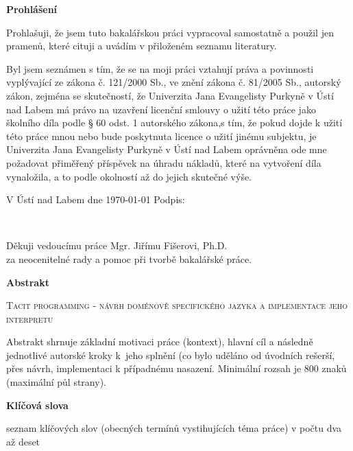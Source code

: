 \documentclass[male,czech]{kithesis}
\newcommand{\TITULcz}{Tacit programming - návrh doménově specifického jazyka a implementace jeho interpretu} %
\begin{document}
\cleardoublepage
\thispagestyle{empty}

\textbf{Prohlášení}

Prohlašuji, že jsem tuto bakalářskou práci vypracoval samostatně a použil
jen pramenů, které cituji a uvádím v přiloženém seznamu literatury.

\vspace{1em}
Byl jsem seznámen s tím, že se na moji práci vztahují práva a povinnosti vyplývající ze zákona č. 121/2000 Sb., ve znění zákona č. 81/2005 Sb., autorský zákon, zejména se skutečností, že Univerzita Jana Evangelisty Purkyně v Ústí nad Labem má právo na uzavření licenční smlouvy o užití této práce jako školního díla podle § 60 odst. 1 autorského zákona,s tím, že pokud dojde k užití této práce mnou nebo bude poskytnuta licence o užití jinému
subjektu, je Univerzita Jana Evangelisty Purkyně v Ústí nad Labem oprávněna ode mne požadovat přiměřený příspěvek na úhradu nákladů, které na vytvoření díla vynaložila, a to podle okolností až do jejich skutečné výše.

\vspace{1em}
V Ústí nad Labem dne \today \hspace{0.3\textwidth} Podpis:


\cleardoublepage
\thispagestyle{empty}
~\vfill

\begin{flushright}
  Děkuji vedoucímu práce Mgr. Jiřímu Fišerovi, Ph.D.\\ za neocenitelné rady a pomoc při tvorbě bakalářské práce.
\end{flushright}

\cleardoublepage
\thispagestyle{empty}

\textbf{\textsf{Abstrakt}}

\textsc{\TITULcz}

Abstrakt shrnuje základní motivaci práce (kontext), hlavní cíl a následně jednotlivé
autorské kroky k~jeho splnění (co bylo uděláno od úvodních rešerší, přes návrh, implementaci k případnému nasazení. Minimální rozsah je 800 znaků (maximální půl strany).

\textbf{\textsf{Klíčová slova}}

seznam klíčových slov (obecných termínů vystihujících téma práce) v počtu dva až deset 

\vspace{1em}
\hrulefill
\vspace{1em}
\end{document}
